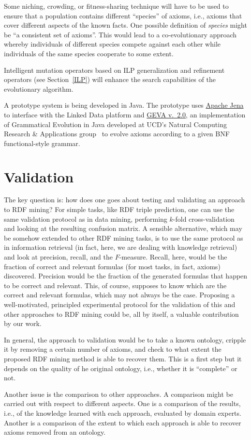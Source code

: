 \documentclass[a4paper]{article}
\newcounter{ex}
\begin{document}
Some niching, crowding, or fitness-sharing technique will have to be used
to ensure that a population contains different ``species'' of axioms,
i.e., axioms that cover different aspects of the known facts.
One possible definition of \emph{species} might be ``a consistent set of axioms''.
This would lead to a co-evolutionary approach whereby individuals of different
species compete against each other while individuals of the same species
cooperate to some extent.

Intelligent mutation operators based on ILP generalization and refinement operators
(see Section~\ref{ILP}) will enhance the search capabilities of the evolutionary algorithm.

A prototype system is being developed in Java.
The prototype uses \href{http://jena.apache.org/}{Apache Jena} to interface with
the Linked Data platform and
\href{http://ncra.ucd.ie/Site/GEVA.html}{GEVA v.~2.0},
an implementation of Grammatical Evolution in Java
developed at UCD's Natural Computing Research \& Applications
group~\cite{ONeillHembergGilliganBartleyMcDermottBrabazon2008}
to evolve axioms according to a given BNF functional-style grammar.


\section{Validation}

The key question is: how does one goes about testing and validating an approach
to RDF mining? For simple tasks, like RDF triple prediction, one can use the same
validation protocol as in data mining, performing $k$-fold cross-validation and
looking at the resulting confusion matrix. A sensible alternative, which may be
somehow extended to other RDF mining tasks, is to use the same protocol as in
information retrieval (in fact, here, we are dealing with knowledge retrieval)
and look at precision, recall, and the $F$-measure.
Recall, here, would be the fraction of correct and relevant formulas
(for most tasks, in fact, axioms) discovered.
Precision would be the fraction of the generated formulas that happen to be correct and relevant.
This, of course, supposes to know which are the correct and relevant formulas, which
may not always be the case.
Proposing a well-motivated, principled experimental protocol for the validation
of this and other approaches to RDF mining could be, all by itself, a valuable
contribution by our work.

In general, the approach to validation would be to take a known ontology,
cripple it by removing a certain number of axioms, and check
to what extent the proposed RDF mining method is able to recover them.
This is a first step but it depends on the quality of he original ontology,
i.e., whether it is ``complete'' or not.

Another issue is the comparison to other approaches. A comparison might be carried out
with respect to different aspects.
One is a comparison of the results, i.e., of the knowledge learned with each approach,
evaluated by domain experts.
Another is a comparison of the extent to which each approach is able to recover axioms
removed from an ontology.



\end{document}
